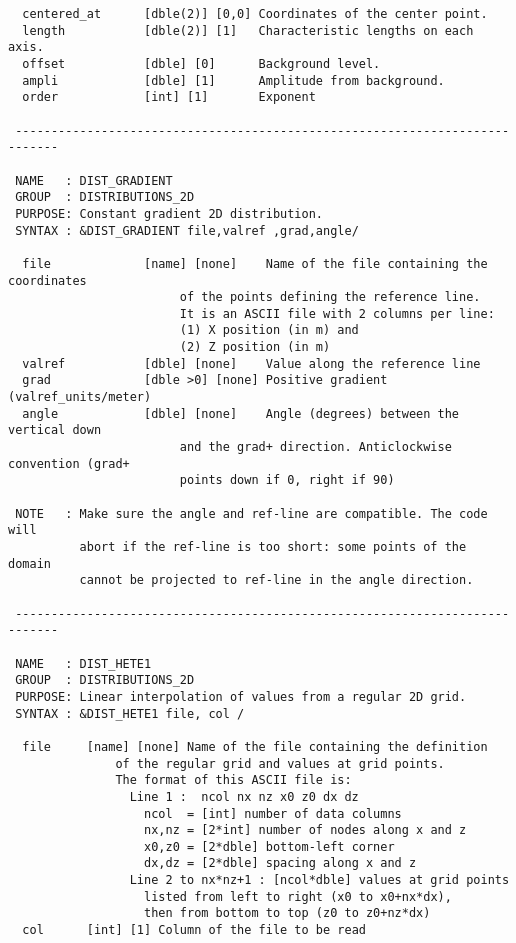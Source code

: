 \begin{verbatim}
  centered_at      [dble(2)] [0,0] Coordinates of the center point.
  length           [dble(2)] [1]   Characteristic lengths on each axis.
  offset           [dble] [0]      Background level.    
  ampli            [dble] [1]      Amplitude from background.
  order            [int] [1]       Exponent

 ----------------------------------------------------------------------------

 NAME   : DIST_GRADIENT
 GROUP  : DISTRIBUTIONS_2D
 PURPOSE: Constant gradient 2D distribution.
 SYNTAX : &DIST_GRADIENT file,valref ,grad,angle/

  file             [name] [none]    Name of the file containing the coordinates
                        of the points defining the reference line.
                        It is an ASCII file with 2 columns per line:
                        (1) X position (in m) and
                        (2) Z position (in m)
  valref           [dble] [none]    Value along the reference line
  grad             [dble >0] [none] Positive gradient (valref_units/meter)
  angle            [dble] [none]    Angle (degrees) between the vertical down 
                        and the grad+ direction. Anticlockwise convention (grad+
                        points down if 0, right if 90)

 NOTE   : Make sure the angle and ref-line are compatible. The code will
          abort if the ref-line is too short: some points of the domain
          cannot be projected to ref-line in the angle direction.

 ----------------------------------------------------------------------------

 NAME   : DIST_HETE1
 GROUP  : DISTRIBUTIONS_2D
 PURPOSE: Linear interpolation of values from a regular 2D grid.
 SYNTAX : &DIST_HETE1 file, col /

  file     [name] [none] Name of the file containing the definition
               of the regular grid and values at grid points.
               The format of this ASCII file is:
                 Line 1 :  ncol nx nz x0 z0 dx dz
                   ncol  = [int] number of data columns 
                   nx,nz = [2*int] number of nodes along x and z
                   x0,z0 = [2*dble] bottom-left corner 
                   dx,dz = [2*dble] spacing along x and z
                 Line 2 to nx*nz+1 : [ncol*dble] values at grid points
                   listed from left to right (x0 to x0+nx*dx), 
                   then from bottom to top (z0 to z0+nz*dx)
  col      [int] [1] Column of the file to be read


\end{verbatim}
